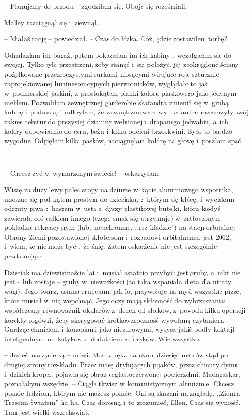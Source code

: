 \documentclass[oneside,polish,11pt,sfheadings]{mwbk}
\begin{document}
-- Planujemy do przodu -- zgodziłam się. Oboje się roześmiali.

Malley rozciągnął się i~ziewnął. 

-- Miałaś rację -- powiedział. -- Czas do
łóżka. Cóż, gdzie zostawiłem torbę?

Odnalazłam ich bagaż, potem pokazałam im ich kabiny i~wczołgałam się do
swojej. Tylko tyle przestrzeni, żeby stanąć i~się położyć, jej
zaokrąglone ściany pożyłkowane przezroczystymi rurkami niosącymi
wirujące roje sztucznie zaprojektowanej luminescencyjnych pierwotniaków,
wyglądało to jak w~podmorskiej jaskini, z~prostokątem pianki koloru
piaskowego jako jedynym meblem. Pozwoliłam zewnętrznej garderobie
skafandra zmienić się w~grubą kołdrę i~poduszkę i~odkryłam, że
wewnętrzne warstwy skafandra rozszerzyły swój zakres tekstur do
puszystej dzianiny wełnianej i~drapanego jedwabiu, a~ich kolory
odpowiednio do ecru, beżu i~kilku odcieni brzoskwini. Było to bardzo
wygodne. Odpięłam kilka pasków, naciągnęłam kołdrę na głowę i~poszłam
spać.

~

-- Chcesz żyć w~wymarzonym świecie! -- oskarżyłam.

Wiszę za duży lewy palec stopy na dziurze w~kącie aluminiowego
wspornika, unosząc się pod kątem prostym do dzieciaka, z~którym się
kłócę, i~wyciskam odrzuty piwa z~haszem w~usta z~dyszy plastikowej
butelki, która kiedyś zawierała coś całkiem innego (czego smak się
utrzymuje) w~zatłoczonym pokładzie rekreacyjnym (lub, nieuchronnie,
,,roz-kładzie'') na stacji orbitalnej Obrony Ziemi pozostawionej
skłotersom i~rozpadowi orbitalnemu, jest 2062, i~wiem, że nie może być i~że śnię. Zatem oskarżenie nie jest szczególnie przekonujące.

Dzieciak ma dziewiętnaście lat i~musiał ostatnio przybyć: jest gruby, a~nikt nie jest -- lub zostaje -- gruby w~nieważkości (to taka wspaniała
dieta dla utraty wagi). Jego twarz, usiana erupcjami jak Io, przywołuje
na myśl wszystkie pizze, które musiał w~nią wepchnąć. Jego oczy mają
skłonność do wybrzuszania: współczesny równoważnik okularów z~denek od
słoików, z~powodu kilku operacji korekty rogówki, żeby skorygować
krótkowzroczność wywołaną czytaniem. Gardząc chmielem i~konopiami jako
niezdrowymi, wysysa jakiś podły koktajl inteligentnych narkotyków z~dodatkiem euforyków. Wie wszystko.

-- Jesteś marzycielką -- mówi. Macha ręką na okno, dziesięć metrów stąd po
drugiej strony roz-kładu. Przez masę dryfujących pijaków, przez chmury
dymu i~dzikich kropel, pojawia się obraz ceglastoczerwonej powierzchni.
Madagaskar, poznałabym wszędzie. -- Ciągle tkwisz w~komunistycznym
altruizmie. Chcesz pomóc ludziom, którym nie możesz pomóc. Oni są
skazani na zagładę. ,,Ziemia Trzecim Światem'' ha ha. Czas dorosną i~to
zrozumieć, Ellen. Czas się wynieść. Tam jest wielki wszechświat.
\end{document}
